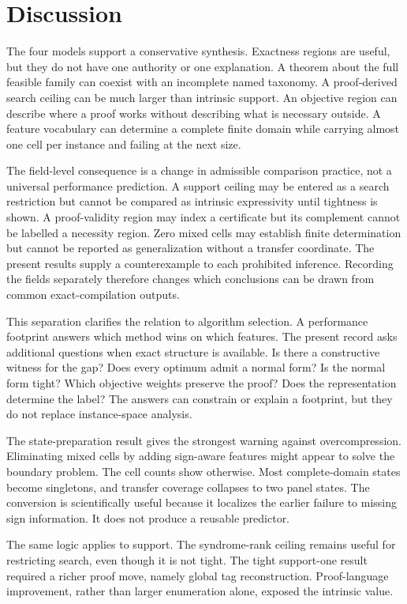 \section{Discussion}

The four models support a conservative synthesis.  Exactness regions are useful, but they do not have one authority or one explanation.  A theorem about the full feasible family can coexist with an incomplete named taxonomy.  A proof-derived search ceiling can be much larger than intrinsic support.  An objective region can describe where a proof works without describing what is necessary outside.  A feature vocabulary can determine a complete finite domain while carrying almost one cell per instance and failing at the next size.

The field-level consequence is a change in admissible comparison practice, not a universal performance prediction.  A support ceiling may be entered as a search restriction but cannot be compared as intrinsic expressivity until tightness is shown.  A proof-validity region may index a certificate but its complement cannot be labelled a necessity region.  Zero mixed cells may establish finite determination but cannot be reported as generalization without a transfer coordinate.  The present results supply a counterexample to each prohibited inference.  Recording the fields separately therefore changes which conclusions can be drawn from common exact-compilation outputs.

This separation clarifies the relation to algorithm selection.  A performance footprint answers which method wins on which features.  The present record asks additional questions when exact structure is available.  Is there a constructive witness for the gap?  Does every optimum admit a normal form?  Is the normal form tight?  Which objective weights preserve the proof?  Does the representation determine the label?  The answers can constrain or explain a footprint, but they do not replace instance-space analysis.

The state-preparation result gives the strongest warning against overcompression.  Eliminating mixed cells by adding sign-aware features might appear to solve the boundary problem.  The cell counts show otherwise.  Most complete-domain states become singletons, and transfer coverage collapses to two panel states.  The conversion is scientifically useful because it localizes the earlier failure to missing sign information.  It does not produce a reusable predictor.

The same logic applies to support.  The syndrome-rank ceiling remains useful for restricting search, even though it is not tight.  The tight support-one result required a richer proof move, namely global tag reconstruction.  Proof-language improvement, rather than larger enumeration alone, exposed the intrinsic value.

